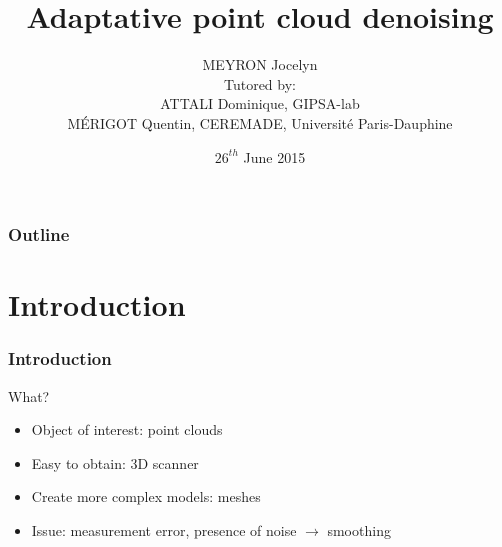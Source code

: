 \documentclass{beamer}
\title[Adaptative point cloud denoising]{Adaptative point cloud denoising}
\author[MEYRON Jocelyn]{MEYRON Jocelyn\\\scriptsize{Tutored by:\\
        ATTALI Dominique, GIPSA-lab\\
        MÉRIGOT Quentin, CEREMADE, Université Paris-Dauphine}}
\institute{GIPSA-lab}
\date{$ 26^{th} $ June 2015}
\begin{document}
\begin{frame}
    \titlepage
\end{frame}

\begin{frame}
    \frametitle{Outline}
    \tableofcontents
\end{frame}

\section{Introduction}

\begin{frame}[allowframebreaks]
    \frametitle{Introduction}

    What?
    \begin{itemize}
        \item Object of interest: point clouds
        \item Easy to obtain: 3D scanner
        \item Create more complex models: meshes
        \item Issue: measurement error, presence of noise $ \to $ smoothing
    \end{itemize}


\end{frame}
\end{document}
